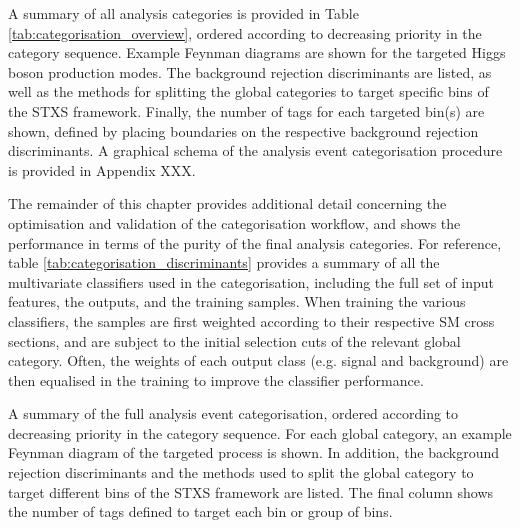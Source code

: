 A summary of all analysis categories is provided in Table \ref{tab:categorisation_overview}, ordered according to decreasing priority in the category sequence. Example Feynman diagrams are shown for the targeted Higgs boson production modes. The background rejection discriminants are listed, as well as the methods for splitting the global categories to target specific bins of the STXS framework. Finally, the number of tags for each targeted bin(s) are shown, defined by placing boundaries on the respective background rejection discriminants. A graphical schema of the analysis event categorisation procedure is provided in Appendix XXX.

The remainder of this chapter provides additional detail concerning the optimisation and validation of the categorisation workflow, and shows the performance in terms of the purity of the final analysis categories. For reference, table \ref{tab:categorisation_discriminants} provides a summary of all the multivariate classifiers used in the categorisation, including the full set of input features, the outputs, and the training samples. When training the various classifiers, the samples are first weighted according to their respective SM cross sections, and are subject to the initial selection cuts of the relevant global category. Often, the weights of each output class (e.g. signal and background) are then equalised in the training to improve the classifier performance.

\begin{table}[htb]
    \caption[Categorisation overview]{A summary of the full analysis event categorisation, ordered according to decreasing priority in the category sequence. For each global category, an example Feynman diagram of the targeted process is shown. In addition, the background rejection discriminants and the methods used to split the global category to target different bins of the STXS framework are listed. The final column shows the number of tags defined to target each bin or group of bins.}
    \label{tab:categorisation_overview}
    \centering
    \tiny
    \renewcommand{\arraystretch}{1.3}
    \setlength{\tabcolsep}{2pt}
    \hspace*{-5cm}
    
    \hspace*{-5cm}
\end{table}

